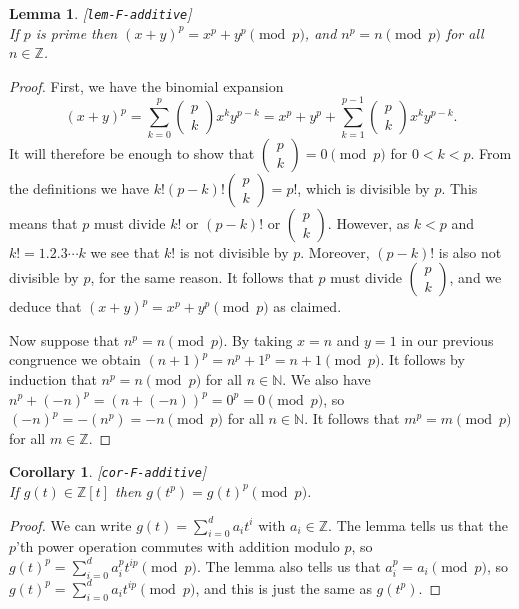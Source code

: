 \documentclass{amsart}
\newcommand{\lbl}[1]{\label{#1}\textup{[\texttt{#1}]}\ \\}
\newcommand{\lbl}{\label}
\newcommand{\N}         {{\mathbb{N}}}
\newcommand{\Z}         {{\mathbb{Z}}}
\newcommand{\bcf}[2]{\left(\begin{array}{c}{#1}\\{#2}\end{array}\right)}
\renewcommand{\:}{\colon}
\newtheorem{lemma}[theorem]{Lemma}
\newtheorem{corollary}[theorem]{Corollary}
\theoremstyle{definition}
\begin{document}
\begin{lemma}\lbl{lem-F-additive}
 If $p$ is prime then $(x+y)^p=x^p+y^p\pmod{p}$, and $n^p=n\pmod{p}$
 for all $n\in\Z$.
\end{lemma}
\begin{proof}
 First, we have the binomial expansion
 \[ (x+y)^p = \sum_{k=0}^p \bcf{p}{k} x^ky^{p-k} 
     = x^p+y^p+\sum_{k=1}^{p-1} \bcf{p}{k} x^ky^{p-k}.
 \]
 It will therefore be enough to show that $\bcf{p}{k}=0\pmod{p}$ for
 $0<k<p$.  From the definitions we have $k!(p-k)!\bcf{p}{k}=p!$, which
 is divisible by $p$.  This means that $p$ must divide $k!$ or
 $(p-k)!$ or $\bcf{p}{k}$.  However, as $k<p$ and $k!=1.2.3\dotsb k$
 we see that $k!$ is not divisible by $p$.  Moreover, $(p-k)!$ is also
 not divisible by $p$, for the same reason.  It follows that $p$ must
 divide $\bcf{p}{k}$, and we deduce that $(x+y)^p=x^p+y^p\pmod{p}$ as
 claimed.  

 Now suppose that $n^p=n\pmod{p}$.  By taking $x=n$ and $y=1$ in our
 previous congruence we obtain $(n+1)^p=n^p+1^p=n+1\pmod{p}$.  It
 follows by induction that $n^p=n\pmod{p}$ for all $n\in\N$.  We also
 have $n^p+(-n)^p=(n+(-n))^p=0^p=0\pmod{p}$, so
 $(-n)^p=-(n^p)=-n\pmod{p}$ for all $n\in\N$.  It follows that
 $m^p=m\pmod{p}$ for all $m\in\Z$.
\end{proof}
\begin{corollary}\lbl{cor-F-additive}
 If $g(t)\in\Z[t]$ then $g(t^p)=g(t)^p\pmod{p}$.
\end{corollary}
\begin{proof}
 We can write $g(t)=\sum_{i=0}^da_it^i$ with $a_i\in\Z$.  The lemma
 tells us that the $p$'th power operation commutes with addition
 modulo $p$, so $g(t)^p=\sum_{i=0}^da_i^pt^{ip}\pmod{p}$.  The lemma
 also tells us that $a_i^p=a_i\pmod{p}$, so
 $g(t)^p=\sum_{i=0}^da_it^{ip}\pmod{p}$, and this is just the same as
 $g(t^p)$.  
\end{proof}
\end{document}
